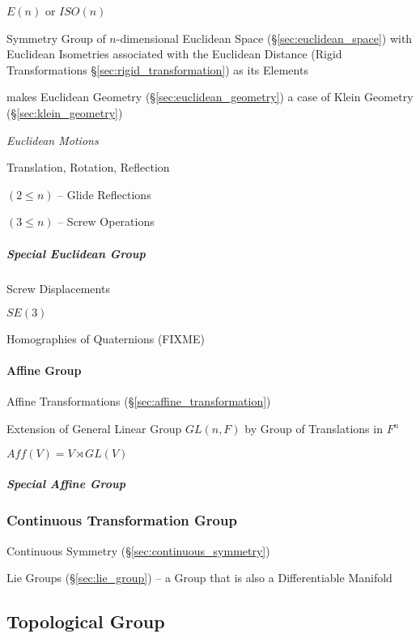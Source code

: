 $E(n)$ or $ISO(n)$

Symmetry Group of $n$-dimensional Euclidean Space (\S\ref{sec:euclidean_space})
with Euclidean Isometries associated with the Euclidean Distance (Rigid
Transformations \S\ref{sec:rigid_transformation}) as its Elements

makes Euclidean Geometry (\S\ref{sec:euclidean_geometry}) a case of
Klein Geometry (\S\ref{sec:klein_geometry})


\emph{Euclidean Motions}

Translation, Rotation, Reflection

$(2 \leq n)$ -- Glide Reflections

$(3 \leq n)$ -- Screw Operations



\subparagraph{Special Euclidean Group}\label{sec:special_euclidean}\hfill

Screw Displacements

$SE(3)$

Homographies of Quaternions (FIXME)



\paragraph{Affine Group}\label{sec:affine_group}\hfill

Affine Transformations (\S\ref{sec:affine_transformation})

Extension of General Linear Group $GL(n,F)$ by Group of Translations in $F^n$

$Aff(V) = V \rtimes GL(V)$



\subparagraph{Special Affine Group}\label{sec:special_affine_group}\hfill



\subsubsection{Continuous Transformation Group}
\label{sec:continuous_transformation_group}

Continuous Symmetry (\S\ref{sec:continuous_symmetry})

Lie Groups (\S\ref{sec:lie_group}) -- a Group that is also a
Differentiable Manifold



\subsection{Topological Group}\label{sec:topological_group}

